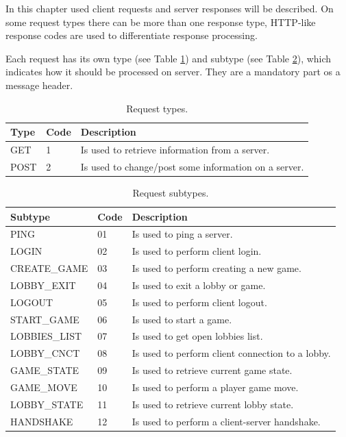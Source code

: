 \documentclass[english, sem, kiv, he, iso690alph, pdf, viewonly]{fasthesis}
\begin{document}
In this chapter used client requests and server responses will be described. On some request types there can be more than one response type, \ac{HTTP}-like response codes are used to differentiate response processing.

Each request has its own type (see Table \ref{tab:request_types}) and subtype (see Table \ref{tab:request_subtypes}), which indicates how it should be processed on server. They are a mandatory part os a message header. 

\begin{table}[h!]
	\centering
	\begin{tabular}{|l|l|l|}
		\hline
		\textbf{Type} & \textbf{Code} & \textbf{Description} \\ \hline
		GET & 1 & Is used to retrieve information from a server. \\ \hline
		POST & 2 & Is used to change/post some information on a server. \\ \hline
	\end{tabular}
	\caption{Request types.}
	\label{tab:request_types}
\end{table}

\begin{table}[h!]
	\centering
	\begin{tabular}{|l|l|l|}
		\hline
		\textbf{Subtype} & \textbf{Code} & \textbf{Description} \\ \hline
		PING & 01 & Is used to ping a server. \\ \hline
		LOGIN & 02 & Is used to perform client login. \\ \hline
		CREATE\_GAME & 03 & Is used to perform creating a new game. \\ \hline
		LOBBY\_EXIT & 04 & Is used to exit a lobby or game. \\ \hline
		LOGOUT & 05 & Is used to perform client logout. \\ \hline
		START\_GAME & 06 & Is used to start a game. \\ \hline
		LOBBIES\_LIST & 07 & Is used to get open lobbies list. \\ \hline
		LOBBY\_CNCT & 08 & Is used to perform client connection to a lobby. \\ \hline
		GAME\_STATE & 09 & Is used to retrieve current game state. \\ \hline
		GAME\_MOVE & 10 & Is used to perform a player game move. \\ \hline
		LOBBY\_STATE & 11 & Is used to retrieve current lobby state. \\ \hline
		HANDSHAKE & 12 & Is used to perform a client-server handshake. \\ \hline
	\end{tabular}
	\caption{Request subtypes.}
	\label{tab:request_subtypes}
\end{table}
\end{document}
